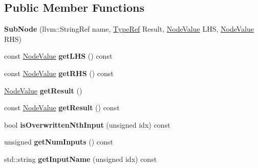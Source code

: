 \subsection*{Public Member Functions}
\begin{DoxyCompactItemize}
\item 
\mbox{\label{classglow_1_1_sub_node_a2896fd467e265d2acf5b2dd54909284e}} 
{\bfseries Sub\+Node} (llvm\+::\+String\+Ref name, \hyperlink{structglow_1_1_type}{Type\+Ref} Result, \hyperlink{structglow_1_1_node_value}{Node\+Value} L\+HS, \hyperlink{structglow_1_1_node_value}{Node\+Value} R\+HS)
\item 
\mbox{\label{classglow_1_1_sub_node_ad0a010468a2aff8dc6cd9ae9e62b206d}} 
const \hyperlink{structglow_1_1_node_value}{Node\+Value} {\bfseries get\+L\+HS} () const
\item 
\mbox{\label{classglow_1_1_sub_node_acb5e0d96e6be908d3d13f7c575927fd0}} 
const \hyperlink{structglow_1_1_node_value}{Node\+Value} {\bfseries get\+R\+HS} () const
\item 
\mbox{\label{classglow_1_1_sub_node_a64c17ee1d3e3c361fb7f096b799e6f1e}} 
\hyperlink{structglow_1_1_node_value}{Node\+Value} {\bfseries get\+Result} ()
\item 
\mbox{\label{classglow_1_1_sub_node_a725ed03cd03b89d075dc87bced7932c7}} 
const \hyperlink{structglow_1_1_node_value}{Node\+Value} {\bfseries get\+Result} () const
\item 
\mbox{\label{classglow_1_1_sub_node_a9cc5b92f06d2e3998c899b8908336345}} 
bool {\bfseries is\+Overwritten\+Nth\+Input} (unsigned idx) const
\item 
\mbox{\label{classglow_1_1_sub_node_ae84fc90904546be34bebb52b1bf0e817}} 
unsigned {\bfseries get\+Num\+Inputs} () const
\item 
\mbox{\label{classglow_1_1_sub_node_a6429ebfbd37f98a63a9b50508a5fda2f}} 
std\+::string {\bfseries get\+Input\+Name} (unsigned idx) const
\item 
\mbox{\label{classglow_1_1_sub_node_a4a281e16b4e9ac888122f33092ec45a9}} 

\end{DoxyCompactItemize}
